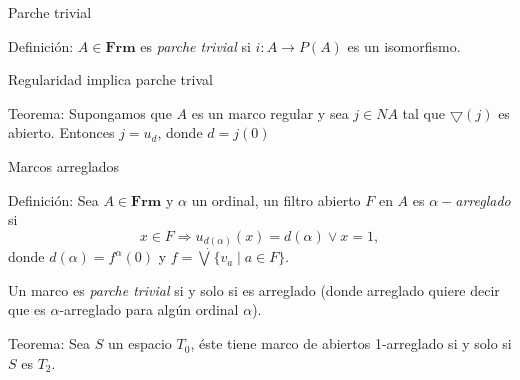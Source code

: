 \documentclass[compress,12pt]{beamer}
\begin{document}
\begin{frame}{Parche trivial}
	\begin{block}{Definición:}
		$A\in \mathbf{Frm}$ es \emph{parche trivial} si $i\colon A\to P(A)$ es un isomorfismo.
	\end{block}

\end{frame}

\begin{frame}{Regularidad implica parche trival}
	\begin{block}{Teorema:}
		Supongamos que $A$ es un marco regular y sea $j\in NA$ tal que $\bigtriangledown (j)$ es abierto. Entonces $j=u_d$, donde $d=j(0)$
	\end{block}
\end{frame}    

\begin{frame}{Marcos arreglados}
	\begin{block}{Definición:}
		Sea $A\in \mathbf{Frm}$ y $\alpha$ un ordinal, un filtro abierto $F$ en $A$ es $\alpha-$\emph{arreglado} si \[x\in F\Rightarrow u_{d(\alpha)}(x)=d(\alpha)\vee x=1,\] donde $d(\alpha)=f^{\alpha}(0)$ y $f=\dot\bigvee\{v_a\mid a\in F\}$.
		\end{block}
\end{frame}

\begin{frame}
	Un marco es \emph{parche trivial} si y solo si es arreglado (donde arreglado quiere decir que es $\alpha$-arreglado para algún ordinal $\alpha$).

	\begin{block}{Teorema:}
		Sea $S$ un espacio $T_{0}$, éste tiene \alert<4->{marco de abiertos 1-arreglado si y solo si $S$ es $T_2$}.
		\end{block}
\end{frame}
\end{document}
